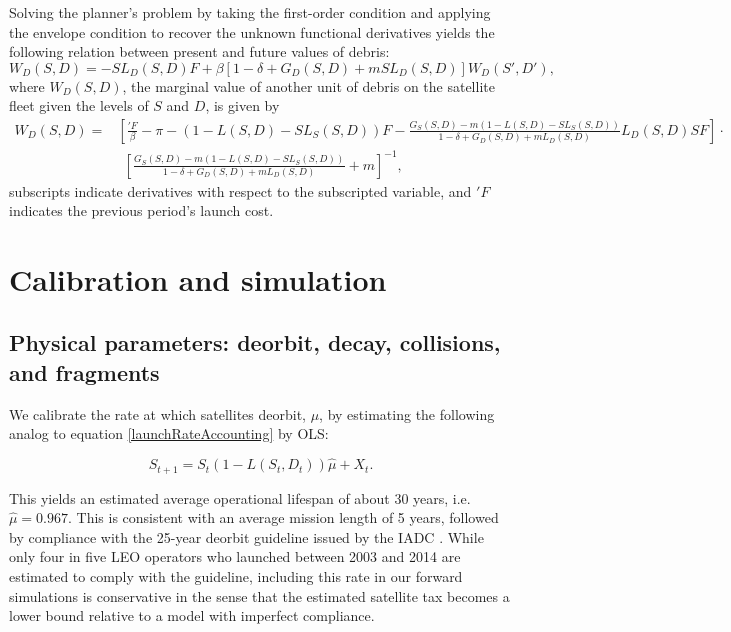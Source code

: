 \documentclass[12pt]{article}
\begin{document}
Solving the planner's problem by taking the first-order condition and applying the envelope condition to recover the unknown functional derivatives yields the following relation between present and future values of debris:
\begin{equation}
\label{plannersFOC}
W_D(S,D) = - S L_D(S,D) F + \beta [1 - \delta + G_D(S,D) + m SL_D(S,D)] W_D(S',D'),
\end{equation}
where $W_D(S,D)$, the marginal value of another unit of debris on the satellite fleet given the levels of $S$ and $D$, is given by
\begin{align}
\label{W_Dformula}
W_D(S,D) =& \left[ \frac{'F}{\beta} - \pi - (1 - L(S,D) - S L_S(S,D))F - \frac{G_S(S,D) - m(1 - L(S,D) - SL_S(S,D))}{1 - \delta + G_D(S,D) + m L_D(S,D)}L_D(S,D) S F  \right] \cdot \nonumber \\
& ~~ \left[ \frac{G_S(S,D) - m(1 - L(S,D) - SL_S(S,D))}{1 - \delta + G_D(S,D) + m L_D(S,D)} + m \right]^{-1},
\end{align}
subscripts indicate derivatives with respect to the subscripted variable, and $'F$ indicates the previous period's launch cost.

\section{Calibration and simulation}

\subsection{Physical parameters: deorbit, decay, collisions, and fragments}

We calibrate the rate at which satellites deorbit, $\mu$, by estimating the following analog to equation \ref{launchRateAccounting} by OLS:

\begin{equation}
\label{deorbitRateEstimate}
S_{t+1} = S_t(1-L(S_t,D_t))\hat{\mu} + X_t.
\end{equation}

This yields an estimated average operational lifespan of about 30 years, i.e. $\hat{\mu} = 0.967$. This is consistent with an average mission length of 5 years, followed by compliance with the 25-year deorbit guideline issued by the IADC \citep{IADCdmg}. While only four in five LEO operators who launched between 2003 and 2014 are estimated to comply with the guideline, including this rate in our forward simulations is conservative in the sense that the estimated satellite tax becomes a lower bound relative to a model with imperfect compliance. \\
\end{document}
